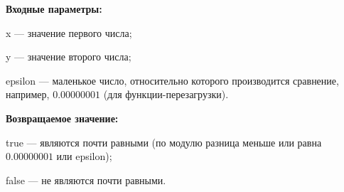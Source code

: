 \textbf{Входные параметры:}

  x --- значение первого числа;
  
 y --- значение второго числа;
	
 epsilon --- маленькое число, относительно которого производится сравнение, например, $0.00000001$ (для функции-перезагрузки).

\textbf{Возвращаемое значение:}

 true --- являются почти равными (по модулю разница меньше или равна $0.00000001$ или epsilon);
 
 false --- не являются почти равными.